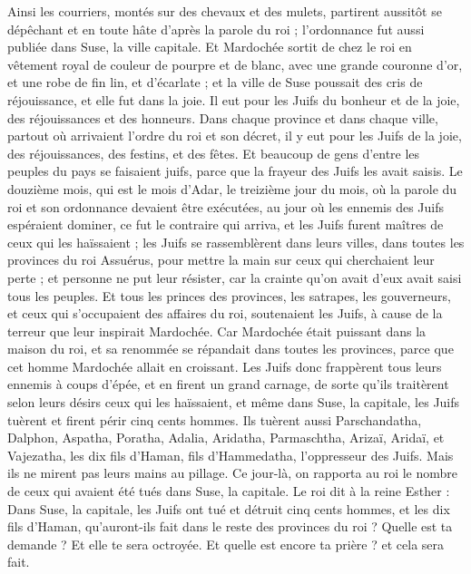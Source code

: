\begin{multicols}{2}
Ainsi les courriers, montés sur des chevaux et des mulets, partirent aussitôt se dépêchant et en toute hâte d'après la parole du roi ; l’ordonnance fut aussi publiée dans Suse, la ville capitale.
Et Mardochée sortit de chez le roi en vêtement royal de couleur de pourpre et de blanc, avec une grande couronne d’or, et une robe de fin lin, et d’écarlate ; et la ville de Suse poussait des cris de réjouissance, et elle fut dans la joie.
Il eut pour les Juifs du bonheur et de la joie, des réjouissances et des honneurs.
Dans chaque province et dans chaque ville, partout où arrivaient l’ordre du roi et son décret, il y eut pour les Juifs de la joie, des réjouissances, des festins, et des fêtes. Et beaucoup de gens d'entre les peuples du pays se faisaient juifs, parce que la frayeur des Juifs les avait saisis.
\VerseOne{}Le douzième mois, qui est le mois d'Adar, le treizième jour du mois, où la parole du roi et son ordonnance devaient être exécutées, au jour où les ennemis des Juifs espéraient dominer, ce fut le contraire qui arriva, et les Juifs furent maîtres de ceux qui les haïssaient ; 
les Juifs se rassemblèrent dans leurs villes, dans toutes les provinces du roi Assuérus, pour mettre la main sur ceux qui cherchaient leur perte ; et personne ne put leur résister, car la crainte qu'on avait d'eux avait saisi tous les peuples.
Et tous les princes des provinces, les satrapes, les gouverneurs, et ceux qui s’occupaient des affaires du roi, soutenaient les Juifs, à cause de la terreur que leur inspirait Mardochée.
Car Mardochée était puissant dans la maison du roi, et sa renommée se répandait dans toutes les provinces, parce que cet homme Mardochée allait en croissant.
Les Juifs donc frappèrent tous leurs ennemis à coups d’épée, et en firent un grand carnage, de sorte qu’ils traitèrent selon leurs désirs ceux qui les haïssaient,
et même dans Suse, la capitale, les Juifs tuèrent et firent périr cinq cents hommes.
Ils tuèrent aussi Parschandatha, Dalphon, Aspatha,
Poratha, Adalia, Aridatha,
Parmaschtha, Arizaï, Aridaï, et Vajezatha,
les dix fils d'Haman, fils d'Hammedatha, l'oppresseur des Juifs. Mais ils ne mirent pas leurs mains au pillage.
Ce jour-là, on rapporta au roi le nombre de ceux qui avaient été tués dans Suse, la capitale.
Le roi dit à la reine Esther : Dans Suse, la capitale, les Juifs ont tué et détruit cinq cents hommes, et les dix fils d'Haman, qu'auront-ils fait dans le reste des provinces du roi ? Quelle est ta demande ? Et elle te sera octroyée. Et quelle est encore ta prière ? et cela sera fait.

\end{multicols}

